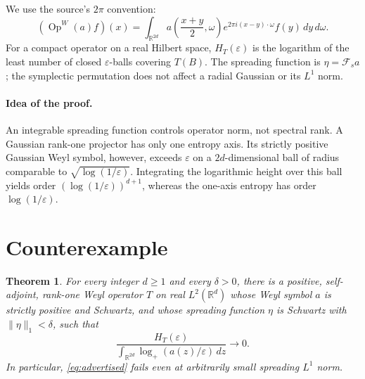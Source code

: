 \documentclass[11pt]{article}
\newtheorem{theorem}{Theorem}
\DeclareMathOperator{\Op}{Op}
\newcommand{\R}{\mathbb R}
\newcommand{\eps}{\varepsilon}
\begin{document}
We use the source's $2\pi$ convention:
\begin{equation}\label{eq:weyl}
(\Op^W(a)f)(x)=\int_{\R^{2d}}
a\!\left(\frac{x+y}{2},\omega\right)
e^{2\pi i(x-y)\cdot\omega}f(y)\,dy\,d\omega.
\end{equation}
For a compact operator on a real Hilbert space, $H_T(\eps)$ is the logarithm
of the least number of closed $\eps$-balls covering $T(B)$.
The spreading function is $\eta=\mathcal F_s a$; the symplectic permutation
does not affect a radial Gaussian or its $L^1$ norm.

\paragraph{Idea of the proof.}
An integrable spreading function controls operator norm, not spectral rank.
A Gaussian rank-one projector has only one entropy axis.  Its strictly
positive Gaussian Weyl symbol, however, exceeds $\eps$ on a $2d$-dimensional
ball of radius comparable to $\sqrt{\log(1/\eps)}$.  Integrating the
logarithmic height over this ball yields order
$(\log(1/\eps))^{d+1}$, whereas the one-axis entropy has order
$\log(1/\eps)$.

\section{Counterexample}

\begin{theorem}\label{thm:main}
For every integer $d\ge1$ and every $\delta>0$, there is a positive,
self-adjoint, rank-one Weyl operator $T$ on real $L^2(\R^d)$ whose Weyl
symbol $a$ is strictly positive and Schwartz, and whose spreading function
$\eta$ is Schwartz with $\|\eta\|_1<\delta$, such that
\[
\frac{H_T(\eps)}{
\displaystyle\int_{\R^{2d}}\log_+(a(z)/\eps)\,dz}
\longrightarrow0.
\]
In particular, \eqref{eq:advertised} fails even at arbitrarily small
spreading $L^1$ norm.
\end{theorem}
\end{document}
